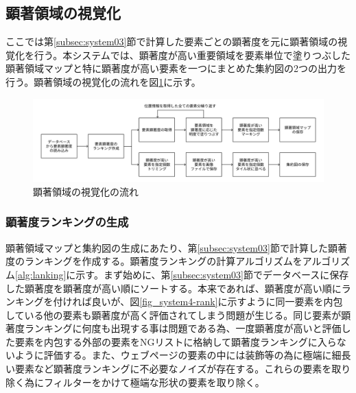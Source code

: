 \subsection{顕著領域の視覚化}\label{subsec:system04}
\par ここでは第\ref{subsec:system03}節で計算した要素ごとの顕著度を元に顕著領域の視覚化を行う。本システムでは、顕著度が高い重要領域を要素単位で塗りつぶした顕著領域マップと特に顕著度が高い要素を一つにまとめた集約図の2つの出力を行う。顕著領域の視覚化の流れを図\ref{fig_system04}に示す。

\begin{figure}[H]
    \centering
    \includegraphics[width=12cm]{figures/06_process04.jpg}
    \caption{顕著領域の視覚化の流れ}
    \label{fig_system04}
\end{figure}

\subsubsection{顕著度ランキングの生成}\label{subsec:system04-1}
\par 顕著領域マップと集約図の生成にあたり、第\ref{subsec:system03}節で計算した顕著度のランキングを作成する。顕著度ランキングの計算アルゴリズムをアルゴリズム\ref{alg:lanking}に示す。まず始めに、第\ref{subsec:system03}節でデータベースに保存した顕著度を顕著度が高い順にソートする。本来であれば、顕著度が高い順にランキングを付ければ良いが、図\ref{fig_system4-rank}に示すように同一要素を内包している他の要素も顕著度が高く評価されてしまう問題が生じる。同じ要素が顕著度ランキングに何度も出現する事は問題である為、一度顕著度が高いと評価した要素を内包する外部の要素をNGリストに格納して顕著度ランキングに入らないように評価する。また、ウェブページの要素の中には装飾等の為に極端に細長い要素など顕著度ランキングに不必要なノイズが存在する。これらの要素を取り除く為にフィルターをかけて極端な形状の要素を取り除く。

